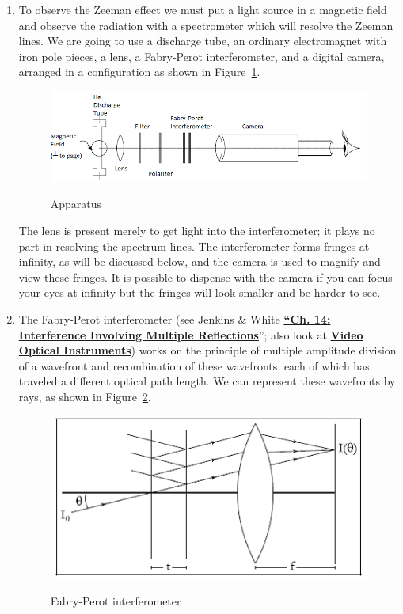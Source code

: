 \documentclass{../lab}
\begin{document}
\begin{enumerate}
    \item To observe the Zeeman effect we must put a light source in a magnetic field and observe the radiation with a spectrometer which will resolve the Zeeman lines. We are going to use a discharge tube, an ordinary electromagnet with iron pole pieces, a lens, a Fabry-Perot interferometer, and a digital camera, arranged in a configuration as shown in Figure~\ref{fig:ATMFig2}. 
    \begin{figure}[h]
        \centering
        \href{http://experimentationlab.berkeley.edu/sites/default/files/images/ATMFig2.gif}{\includegraphics[width=0.5\linewidth]{images/ATMFig2.png}}
        \caption{Apparatus}
        \label{fig:ATMFig2}
    \end{figure}

	The lens is present merely to get light into the interferometer; it plays no part in resolving the spectrum lines. The interferometer forms fringes at infinity, as will be discussed below, and the camera is used to magnify and view these fringes. It is possible to dispense with the camera if you can focus your eyes at infinity but the fringes will look smaller and be harder to see.

    \item The Fabry-Perot interferometer (see Jenkins \& White \href{http://physics111.lib.berkeley.edu/Physics111/Reprints/ATM/04-Interference.pdf}{\textbf{``Ch. 14: Interference Involving Multiple Reflections}}''; also look at \href{http://youtu.be/zUGBt5vc5FA}{\textbf{Video Optical Instruments}}) works on the principle of multiple amplitude division of a wavefront and recombination of these wavefronts, each of which has traveled a different optical path length. We can represent these wavefronts by rays, as shown in Figure~\ref{fig:Atm1image005}.

    \begin{figure}[H]
        \centering
        \href{http://experimentationlab.berkeley.edu/sites/default/files/images/Atm1image005.gif}{\includegraphics[width=0.5\linewidth]{images/Atm1image005.png}}
        \caption{Fabry-Perot interferometer}
        \label{fig:Atm1image005}
    \end{figure}


\end{enumerate}
\end{document}

